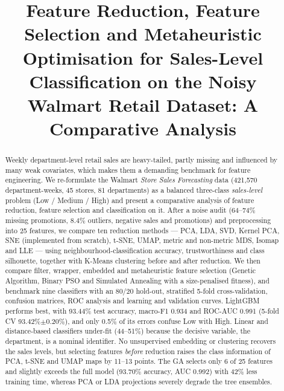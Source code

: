 \documentclass[conference]{IEEEtran}
\begin{document}
\title{Feature Reduction, Feature Selection and Metaheuristic Optimisation for Sales-Level Classification on the Noisy Walmart Retail Dataset: A Comparative Analysis}

\author{
}

\maketitle

\begin{abstract}
Weekly department-level retail sales are heavy-tailed, partly missing and influenced by many weak covariates, which makes them a demanding benchmark for feature engineering. We re-formulate the Walmart \emph{Store Sales Forecasting} data (421{,}570 department-weeks, 45 stores, 81 departments) as a balanced three-class \emph{sales-level} problem (Low / Medium / High) and present a comparative analysis of feature reduction, feature selection and classification on it. After a noise audit (64--74\% missing promotions, 8.4\% outliers, negative sales and promotions) and preprocessing into 25 features, we compare ten reduction methods --- PCA, LDA, SVD, Kernel PCA, SNE (implemented from scratch), t-SNE, UMAP, metric and non-metric MDS, Isomap and LLE --- using neighbourhood-classification accuracy, trustworthiness and class silhouette, together with K-Means clustering before and after reduction. We then compare filter, wrapper, embedded and metaheuristic feature selection (Genetic Algorithm, Binary PSO and Simulated Annealing with a size-penalised fitness), and benchmark nine classifiers with an 80/20 hold-out, stratified 5-fold cross-validation, confusion matrices, ROC analysis and learning and validation curves. LightGBM performs best, with 93.44\% test accuracy, macro-F1 0.934 and ROC-AUC 0.991 (5-fold CV 93.42\%$\pm$0.20\%), and only 0.5\% of its errors confuse Low with High. Linear and distance-based classifiers under-fit (44--51\%) because the decisive variable, the department, is a nominal identifier. No unsupervised embedding or clustering recovers the sales levels, but selecting features \emph{before} reduction raises the class information of PCA, t-SNE and UMAP maps by 11--13 points. The GA selects only 6 of 25 features and slightly exceeds the full model (93.70\% accuracy, AUC 0.992) with 42\% less training time, whereas PCA or LDA projections severely degrade the tree ensembles.
\end{abstract}
\end{document}

